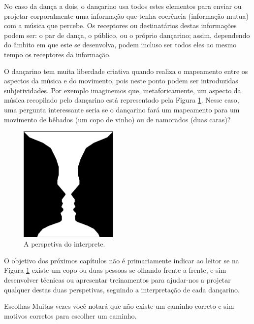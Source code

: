 No caso da dança a dois, o dançarino usa todos estes elementos 
para enviar ou projetar corporalmente uma informação que tenha coerência (informação mutua) com a música que percebe.
Os receptores ou destinatários destas informações podem ser: o par de dança,
o público, ou o próprio dançarino; 
assim, dependendo do âmbito em que este se desenvolva,
podem incluso ser todos eles ao mesmo tempo os receptores da informação.

O dançarino tem muita liberdade criativa quando realiza o 
mapeamento entre os aspectos da música e do movimento, 
pois neste ponto podem ser introduzidas subjetividades. 
Por exemplo imaginemos que, metaforicamente, um aspecto da música recopilado pelo dançarino 
está representado pela Figura \ref{fig:LaCopaDeRubin}.
Nesse caso, uma pergunta interessante seria se 
o dançarino fará um mapeamento para um movimento de bêbados (um copo de vinho) ou de namorados (duas caras)?
\begin{figure}[!h]
  \centering
    \includegraphics[width=0.43\textwidth]{chapters/cap-musicalidade/LaCopaDeRubin.eps}
\caption{A perspetiva do interprete.}
\label{fig:LaCopaDeRubin}
\end{figure}

O objetivo dos próximos  capítulos não é primariamente indicar ao leitor se na Figura \ref{fig:LaCopaDeRubin} 
existe um copo ou duas pessoas se olhando frente a frente, e sim desenvolver técnicas ou 
apresentar treinamentos para ajudar-nos a projetar qualquer destas duas perspetivas, 
seguindo a interpretação de cada dançarino.

\begin{FraseFernandoPR}{Escolhas}
Muitas vezes você notará que não existe um caminho correto 
e sim motivos corretos para escolher um caminho.%
\end{FraseFernandoPR}

